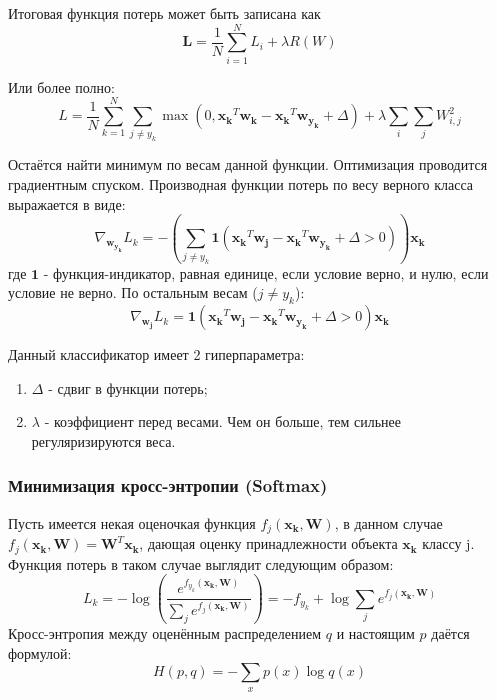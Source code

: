 \documentclass[a4paper]{article}
\newcommand{\wk}{\bm{w_k}}
\newcommand{\xk}{\bm{x_k}}
\newcommand{\W}{\bm{W}}
\begin{document}
Итоговая функция потерь может быть записана как
\begin{equation*}
\bm{L} = \frac{1}{N}\sum_{i = 1}^N L_i + \lambda R(W)
\end{equation*}

Или более полно:
\begin{equation}
L = \frac{1}{N}\sum_{k = 1}^N\sum_{j \neq y_k}\max{(0, \xk^T\wk - \xk^T\bm{w_{y_k}} + \Delta)}  + \lambda\sum_i\sum_j W_{i,j}^2
\end{equation}

Остаётся найти минимум по весам данной функции. Оптимизация проводится градиентным спуском. Производная функции потерь по весу верного класса выражается в виде:
\begin{equation}
\nabla_{\bm{w_{y_k}}} L_k = -\left(\sum_{j \neq y_k} \bm{1}(\xk^T\bm{w_j} - \xk^T\bm{w_{y_k}} + \Delta > 0)\right) \xk
\end{equation}
где $\bm{1}$ - функция-индикатор, равная единице, если условие верно, и нулю, если условие не верно.
По остальным весам ($j \neq y_k$):
\begin{equation}
\nabla_{\bm{w_j}} L_k = \bm{1}(\xk^T\bm{w_j} - \xk^T\bm{w_{y_k}} + \Delta > 0) \xk
\end{equation}

Данный классификатор имеет 2 гиперпараметра:
\begin{enumerate}
\item $\Delta$ - сдвиг в функции потерь;
\item $\lambda$ - коэффициент перед весами. Чем он больше, тем сильнее регуляризируются веса.
\end{enumerate}

\subsubsection{Минимизация кросс-энтропии (Softmax)}

Пусть имеется некая оценочкая функция $f_j(\xk, \W)$, в данном случае $f_j(\xk, \W) = \W^T\xk$, дающая оценку принадлежности объекта $\xk$ классу j. Функция потерь в таком случае выглядит следующим образом:
\begin{equation}
L_k = - \log\left(\frac{e^{f_{y_k}(\xk, \W)}}{\sum_je^{f_j(\xk, \W)}}\right) = 
- f_{y_k} + \log\sum_je^{f_j(\xk, \W)}
\end{equation}
Кросс-энтропия между оценённым распределением $q$ и настоящим $p$ даётся формулой:
\begin{equation}
H(p, q) = - \sum_x p(x)\log q(x)
\end{equation}
\end{document}
